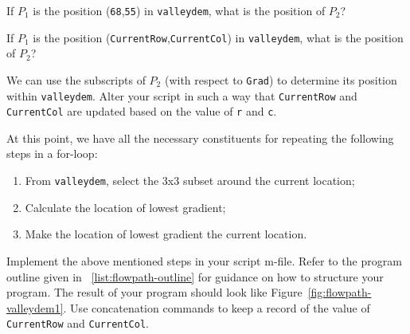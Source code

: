 \begin{action}
If $P_1$ is the position ({\tt 68},{\tt 55}) in {\tt valleydem}, what is the position of $P_2$?
\end{action}


\begin{action}
If $P_1$ is the position ({\tt CurrentRow},{\tt CurrentCol}) in {\tt valleydem}, what is the position of $P_2$?
\end{action}

\begin{action}
We can use the subscripts of $P_2$ (with respect to {\tt Grad}) to determine its position within {\tt valleydem}. Alter your script in such a way that {\tt CurrentRow} and {\tt CurrentCol} are updated based on the value of {\tt r} and {\tt c}.
\end{action}

\noindent At this point, we have all the necessary constituents for repeating the following steps in a for-loop:
\begin{enumerate}
\item From {\tt valleydem}, select the 3x3 subset around the current location;
\item Calculate the location of lowest gradient;
\item Make the location of lowest gradient the current location.
\end{enumerate}

\begin{action}
Implement the above mentioned steps in your script m-file. Refer to the program outline given in \lstlistingname~\ref{list:flowpath-outline} for guidance on how to structure your program. The result of your program should look like Figure~\ref{fig:flowpath-valleydem1}. Use concatenation commands to keep a record of the value of {\tt CurrentRow} and {\tt CurrentCol}.
\end{action}



